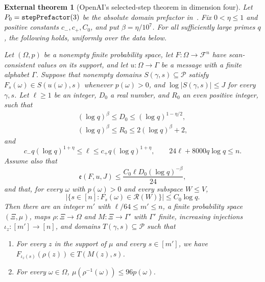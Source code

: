 \documentclass[11pt,a4paper]{article}
\numberwithin{equation}{section}
\newtheorem{external}[theorem]{External theorem}
\newcommand{\src}[1]{\texttt{\detokenize{#1}}}
\begin{document}
\begin{external}[OpenAI's selected-step theorem in dimension four]
\label{thm:oai-step}
Let $P_0=\src{stepPrefactor}(3)$ be the absolute domain prefactor
in~\cite{OAI}. Fix $0<\eta\le1$ and positive constants
$c_-,c_+,C_0$, and put $\beta=\eta/10^7$.
For all sufficiently large primes $q$, the following holds,
uniformly over the data below.

Let $(\Omega,p)$ be a nonempty finite probability space,
let $F:\Omega\to\mathcal F^n$ have scan-consistent values on
its support, and let $u:\Omega\to\Gamma$ be a message with a
finite alphabet $\Gamma$. Suppose that nonempty domains
$S(\gamma,s)\subseteq\mathcal P$ satisfy
$F_s(\omega)\in S(u(\omega),s)$ whenever $p(\omega)>0$,
and $\log|S(\gamma,s)|\le J$ for every $\gamma,s$.
Let $\ell\ge1$ be an integer, $D_0$ a real number, and $R_0$
an even positive integer, such that
\begin{equation}\label{eq:source-admissible}
 \begin{gathered}
 (\log q)^\beta\le D_0\le(\log q)^{1-\eta/2},\\
 (\log q)^\beta\le R_0\le2(\log q)^\beta+2,
 \end{gathered}
\end{equation}
and
\begin{equation}\label{eq:source-length}
 c_-q(\log q)^{1+\eta}\le\ell
 \le c_+q(\log q)^{1+\eta},\qquad
 24\ell+8000q\log q\le n.
\end{equation}
Assume also that
\begin{equation}\label{eq:source-budget}
 \mathfrak e(F,u,J)
 \le\frac{C_0\ell D_0(\log q)^{-\beta}}{24},
\end{equation}
and that, for every $\omega$ with $p(\omega)>0$ and every
subspace $W\le V$,
\begin{equation}\label{eq:source-occupancy}
 |\{s\in[n]:F_s(\omega)\in\mathcal R(W)\}|
 \le C_0\log q.
\end{equation}
Then there are an integer $m'$ with $\ell/64\le m'\le n$,
a finite probability space $(\Xi,\mu)$, maps
$\rho:\Xi\to\Omega$ and $M:\Xi\to\Gamma'$ with
$\Gamma'$ finite, increasing injections
$\iota_z:[m']\to[n]$, and domains
$T(\gamma,s)\subseteq\mathcal P$ such that
\begin{enumerate}
\item[(i)] For every $z$ in the support of $\mu$ and every
$s\in[m']$, we have
$F_{\iota_z(s)}(\rho(z))\in T(M(z),s)$.
\item[(ii)] For every $\omega\in\Omega$,
$\mu(\rho^{-1}(\omega))\le96p(\omega)$.

\end{enumerate}
\end{external}
\end{document}
